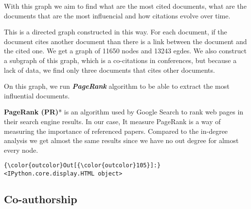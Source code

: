 \documentclass[journal,twocolumn]{IEEEtran}
\begin{document}
With this graph we aim to find what are the most cited documents, what
are the documents that are the most influencial and how citations evolve
over time.

This is a directed graph constructed in this way. For each document, if
the document cites another document than there is a link between the
document and the cited one. We get a graph of 11650 nodes and 13243
egdes. We also construct a subgraph of this graph, which is a
co-citations in conferences, but because a lack of data, we find only
three documents that cites other documents.

On this graph, we run \textbf{\emph{PageRank}} algorithm to be able to
extract the most influential documents.

\textbf{PageRank (PR)}* is an algorithm used by Google Search to rank
web pages in their search engine results. In our case, It measure
PageRank is a way of measuring the importance of referenced papers.
Compared to the in-degree analysis we get almost the same results since
we have no out degree for almost every node.



\begin{Verbatim}[commandchars=\\\{\}]
{\color{outcolor}Out[{\color{outcolor}105}]:} <IPython.core.display.HTML object>
\end{Verbatim}
            
    \subsection{Co-authorship}\label{co-authorship}
\end{document}

